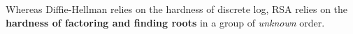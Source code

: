 
Whereas Diffie-Hellman relies on the hardness of discrete log, RSA relies on the \textbf{hardness of factoring and finding roots} in a group of \emph{unknown} order.

